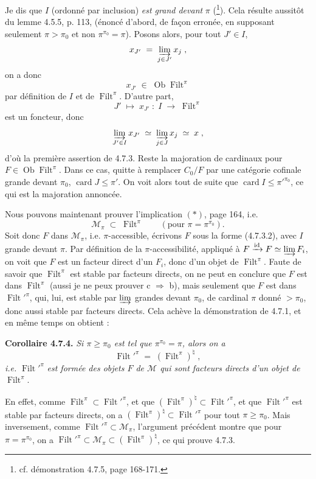 \documentclass[11pt]{article}
\newcommand{\printedpage}[1]{\marginpar{\footnotesize p.~#1}}
\newcommand{\msp}[1]{\marginpar{\footnotesize [#1]}}
\newcommand{\Filt}{\operatorname{Filt}}
\newcommand{\card}{\operatorname{card}}
\newcommand{\Ob}{\operatorname{Ob}}
\begin{document}
\printedpage{55}

Je dis que $I$ (ordonné par inclusion) \textit{est grand devant} $\pi$ (\footnote[69]{cf. démonstration 4.7.5, page 168-171.}). Cela résulte aussitôt du lemme 4.5.5, p. 113, (énoncé d’abord, de façon erronée, en supposant seulement $\pi > \pi_0$ et non $\pi^{\pi_0} = \pi$). Posons alors, pour tout $J' \in I$,
\[
x_{J'} \;=\; \varinjlim_{j \in J'} x_j \;,
\]
on a donc
\[
x_{J'} \;\in\; \Ob \Filt^{\pi}
\]
par définition de $I$ et de $\Filt^{\pi}$. D’autre part,
\[
J' \;\longmapsto\; x_{J'} \;:\; I \;\longrightarrow\; \Filt^{\pi}
\]
\msp{page 166}
est un foncteur, donc
\[
\varinjlim_{J' \in I} x_{J'} \;\simeq\; \varinjlim_{j \in J} x_j \;\simeq\; x \;, %
\]
d’où la première assertion de 4.7.3. Reste la majoration de cardinaux pour $F \in \Ob \Filt^{\pi}$. Dans ce cas, quitte à remplacer $C_0/F$ par une catégorie cofinale grande devant $\pi_0$, $\card J \leqslant \pi'$. On voit alors tout de suite que $\card I \leqslant \pi'^{\pi_0}$, ce qui est la majoration annoncée.

Nous pouvons maintenant prouver l’implication $(*)$, page 164, i.e.
\[
\mathcal{M}_{\pi} \;\subset\; \Filt^{\pi} \qquad (\text{pour } \pi = \pi^{\pi_0}).
\]
Soit donc $F$ dans $\mathcal{M}_{\pi}$, i.e. $\pi$-accessible, écrivons $F$ sous la forme (4.7.3.2), avec $I$ grande devant $\pi$. Par définition de la $\pi$-accessibilité, appliqué à $F \xrightarrow{\mathrm{id}} F \simeq \varinjlim F_i$, on voit que $F$ est un facteur direct d’un $F_i$, donc d’un objet de $\Filt^{\pi}$. Faute de savoir que $\Filt^{\pi}$ est stable par facteurs directs, on ne peut en conclure que $F$ est dans $\Filt^{\pi}$ (aussi je ne peux prouver c $\Longrightarrow$ b), mais seulement que $F$ est dans $\Filt'^{\pi}$, qui, lui, est stable par $\varinjlim$ grandes devant $\pi_0$, de cardinal $\pi$ donné $> \pi_0$, donc aussi \msp{page 167} stable par facteurs directs. Cela achève la démonstration de 4.7.1, et en même temps on obtient :

\textbf{Corollaire 4.7.4.} \textit{Si $\pi \geqslant \pi_0$ est tel que $\pi^{\pi_0} = \pi$, alors on a}
\[
\Filt'^{\pi} \;=\; (\Filt^{\pi})^{\natural} \;, \tag*{(4.7.4.1)}
\]
\textit{i.e.} $\Filt'^{\pi}$ \textit{est formée des objets $F$ de $\mathcal{M}$ qui sont facteurs directs d’un objet de} $\Filt^{\pi}$.

En effet, comme $\Filt^{\pi} \subset \Filt'^{\pi}$, et que $(\Filt^{\pi})^{\natural} \subset \Filt'^{\pi}$, et que $\Filt'^{\pi}$ est stable par facteurs directs, on a $(\Filt^{\pi})^{\natural} \subset \Filt'^{\pi}$ pour tout $\pi \geqslant \pi_0$. Mais inversement, comme $\Filt'^{\pi} \subset \mathcal{M}_{\pi}$, l’argument précédent montre que pour $\pi = \pi^{\pi_0}$, on a $\Filt'^{\pi} \subset \mathcal{M}_{\pi} \subset (\Filt^{\pi})^{\natural}$, ce qui prouve 4.7.3.
\end{document}
